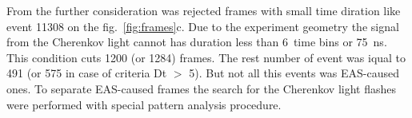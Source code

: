 \documentclass[final,5p,times,twocolumn]{elsarticle}
\begin{document}
From the further consideration was rejected frames with small time diration like event 11308 on the fig.~\ref{fig:frames}c. Due to the experiment geometry the signal from the Cherenkov light cannot has duration less than 6~time bins or 75~ns. This condition cuts 1200 (or 1284) frames. 
The rest number of event was iqual to 491 (or 575 in case of criteria Dt $>$ 5). But not all this events was EAS-caused ones. To separate EAS-caused frames the search for the Cherenkov light flashes were performed with special pattern analysis procedure. %





\end{document}
